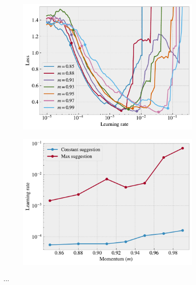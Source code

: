 \begin{figure}[H]
  \centering
  \begin{subfigure}[t]{0.49\textwidth}
      \centering
      \includegraphics[width=\textwidth]{figures/ML/LR_momentum_test_a.pdf}
      \caption{}
  \end{subfigure}
  \hfill
  \begin{subfigure}[t]{0.49\textwidth}
      \centering
      \includegraphics[width=\textwidth]{figures/ML/LR_momentum_test_b.pdf}
      \caption{}
  \end{subfigure}
  \hfill
  \caption{...}
  \label{fig:LR_range_mom}
\end{figure}


